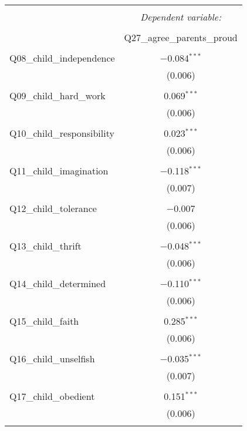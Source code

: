
\begin{table}[!htbp] \centering 
  \caption{} 
  \label{} 
\begin{tabular}{@{\extracolsep{5pt}}lc} 
\\[-1.8ex]\hline 
\hline \\[-1.8ex] 
 & \multicolumn{1}{c}{\textit{Dependent variable:}} \\ 
\cline{2-2} 
\\[-1.8ex] & Q27\_agree\_parents\_proud \\ 
\hline \\[-1.8ex] 
 Q08\_child\_independence & $-$0.084$^{***}$ \\ 
  & (0.006) \\ 
  & \\ 
 Q09\_child\_hard\_work & 0.069$^{***}$ \\ 
  & (0.006) \\ 
  & \\ 
 Q10\_child\_responsibility & 0.023$^{***}$ \\ 
  & (0.006) \\ 
  & \\ 
 Q11\_child\_imagination & $-$0.118$^{***}$ \\ 
  & (0.007) \\ 
  & \\ 
 Q12\_child\_tolerance & $-$0.007 \\ 
  & (0.006) \\ 
  & \\ 
 Q13\_child\_thrift & $-$0.048$^{***}$ \\ 
  & (0.006) \\ 
  & \\ 
 Q14\_child\_determined & $-$0.110$^{***}$ \\ 
  & (0.006) \\ 
  & \\ 
 Q15\_child\_faith & 0.285$^{***}$ \\ 
  & (0.006) \\ 
  & \\ 
 Q16\_child\_unselfish & $-$0.035$^{***}$ \\ 
  & (0.007) \\ 
  & \\ 
 Q17\_child\_obedient & 0.151$^{***}$ \\ 
  & (0.006) \\ 
  & \\ 

\end{tabular}
\end{table}
